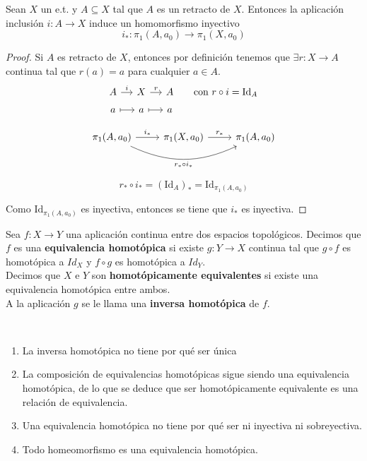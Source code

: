 \begin{lema}
    Sean $X$ un e.t. y $A\subseteq X$ tal que $A$ es un retracto de $X$. Entonces la aplicación inclusión $i:A\to X$ induce un homomorfismo inyectivo
    \[
        i_* : \pi_1(A, a_0) \to \pi_1(X,a_0)
    \]

    \begin{proof}
        Si $A$ es retracto de $X$, entonces por definición tenemos que $\exists r :X \to A$ continua tal que $r(a)=a$ para cualquier $a\in A$.
        \[
        \begin{tikzcd}[row sep=tiny, column sep=small]
            A \arrow[r, "i"] & X \arrow[r, "r"] & A & \text{con } r\circ i = \mathrm{Id}_A \\
            a \arrow[r, maps to] & a \arrow[r, maps to] & a
        \end{tikzcd}
        \]

        \[
        \begin{tikzcd}
            \pi_1(A,a_0) \arrow[r, "i_*"] \arrow[rr, bend right=25, "r_* \circ i_*"'] &
            \pi_1(X,a_0) \arrow[r, "r_*"] &
            \pi_1(A,a_0)
        \end{tikzcd}
        \]

        \[
            r_* \circ i_* = (\mathrm{Id}_A)_* = \mathrm{Id}_{\pi_1(A,a_0)}
        \]
            
        Como $\mathrm{Id}_{\pi_1(A,a_0)}$ es inyectiva, entonces se tiene que $i_*$ es inyectiva.
    \end{proof}
\end{lema}


\begin{definicion}
    Sea $f:X\to Y$ una aplicación continua entre dos espacios topológicos. Decimos que $f$ es una \textbf{equivalencia homotópica} si existe $g:Y\to X$ continua tal que $g\circ f$ es homotópica a $Id_X$ y $f\circ g$ es homotópica a $Id_Y$.\\

    Decimos que $X$ e $Y$ son \textbf{homotópicamente equivalentes} si existe una equivalencia homotópica entre ambos.\\

    A la aplicación $g$ se le llama una \textbf{inversa homotópica} de $f$.
\end{definicion}

\begin{observacion}\
    \begin{enumerate}
        \item La inversa homotópica no tiene por qué ser única
        \item La composición de equivalencias homotópicas sigue siendo una equivalencia homotópica, de lo que se deduce que ser homotópicamente equivalente es una relación de equivalencia.
        \item Una equivalencia homotópica no tiene por qué ser ni inyectiva ni sobreyectiva. 
        \item Todo homeomorfismo es una equivalencia homotópica.
    \end{enumerate}
\end{observacion}

